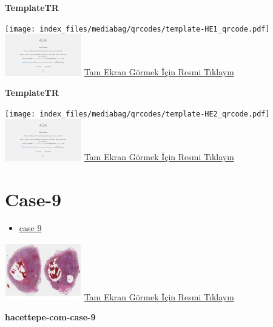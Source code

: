\documentclass[
  letterpaper,
  DIV=11,
  numbers=noendperiod]{scrreprt}
\providecommand{\tightlist}{%
  \setlength{\itemsep}{0pt}\setlength{\parskip}{0pt}}\usepackage{longtable,booktabs,array}
\begin{document}
\textbf{TemplateTR}

\texttt{[image: index\_files/mediabag/qrcodes/template-HE1\_qrcode.pdf]}
\href{https://images.patolojiatlasi.com/template/HE1.html}{\includegraphics[width=0.25\textwidth,height=\textheight]{./screenshots/thumbnail_template-HE1.png}}
\href{https://images.patolojiatlasi.com/template/HE1.html}{Tam Ekran
Görmek İçin Resmi Tıklayın}

\textbf{TemplateTR}

\texttt{[image: index\_files/mediabag/qrcodes/template-HE2\_qrcode.pdf]}
\href{https://images.patolojiatlasi.com/template/HE2.html}{\includegraphics[width=0.25\textwidth,height=\textheight]{./screenshots/thumbnail_template-HE2.png}}
\href{https://images.patolojiatlasi.com/template/HE2.html}{Tam Ekran
Görmek İçin Resmi Tıklayın}

\hypertarget{sec-hacettepe-case-of-the-month-case-9}{%
\section{Case-9}\label{sec-hacettepe-case-of-the-month-case-9}}

\begin{itemize}
\tightlist
\item
  \href{https://www.youtube.com/watch?v=9OxpsDNCHWk&ab_channel=KemalKosemehmetoglu}{case
  9}
\end{itemize}

\href{https://images.patolojiatlasi.com/hacettepe-com-case-9/HE.html}{\includegraphics[width=0.25\textwidth,height=\textheight]{./screenshots/thumbnail_hacettepe-com-case-9.png}}
\href{https://images.patolojiatlasi.com/hacettepe-com-case-9/HE.html}{Tam
Ekran Görmek İçin Resmi Tıklayın}

\textbf{hacettepe-com-case-9}
\end{document}
